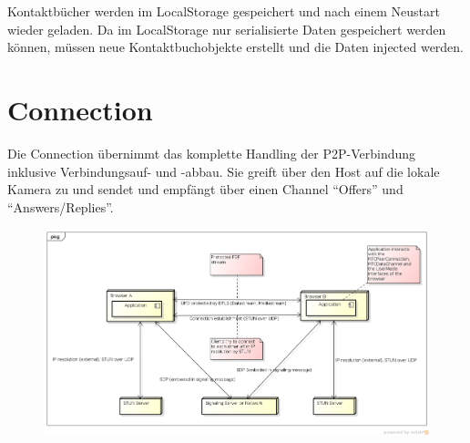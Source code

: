 	Kontaktbücher werden im LocalStorage gespeichert und nach einem Neustart wieder
	geladen. Da im LocalStorage nur serialisierte Daten gespeichert werden können,
	müssen neue Kontaktbuchobjekte erstellt und die Daten injected werden.


\section{Connection}
	Die Connection übernimmt das komplette Handling der P2P-Verbindung inklusive Verbindungsauf- und -abbau. Sie greift über den Host auf die lokale Kamera zu und sendet und empfängt über einen Channel "`Offers"' und "`Answers/Replies"'.
	\begin{figure}[hp]
		\centering
		\includegraphics[width=\textwidth]{../architekturanalayse/img/connection.png}
	\end{figure}
		
